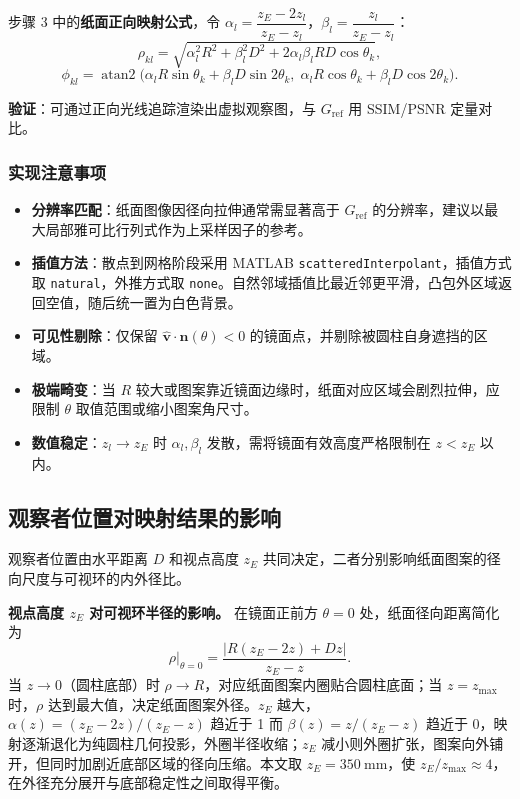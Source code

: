 \documentclass[12pt, a4paper]{ctexart}
\begin{document}
步骤 3 中的\textbf{纸面正向映射公式}，令 $\alpha_l=\dfrac{z_E-2z_l}{z_E-z_l}$，$\beta_l=\dfrac{z_l}{z_E-z_l}$：
\[
\rho_{kl}=\sqrt{\alpha_l^{2}R^{2}+\beta_l^{2}D^{2}+2\alpha_l\beta_l RD\cos\theta_k},
\]
\[
\phi_{kl}=\operatorname{atan2}\!\bigl(\alpha_l R\sin\theta_k+\beta_l D\sin2\theta_k,\;\alpha_l R\cos\theta_k+\beta_l D\cos2\theta_k\bigr).
\]

\textbf{验证}：可通过正向光线追踪渲染出虚拟观察图，与 $G_{\mathrm{ref}}$ 用 SSIM/PSNR 定量对比。

\subsubsection{实现注意事项}
\begin{itemize}
    \item \textbf{分辨率匹配}：纸面图像因径向拉伸通常需显著高于 $G_{\mathrm{ref}}$ 的分辨率，建议以最大局部雅可比行列式作为上采样因子的参考。
    \item \textbf{插值方法}：散点到网格阶段采用 MATLAB \texttt{scatteredInterpolant}，插值方式取 \texttt{natural}，外推方式取 \texttt{none}。自然邻域插值比最近邻更平滑，凸包外区域返回空值，随后统一置为白色背景。
    \item \textbf{可见性剔除}：仅保留 $\hat{\mathbf{v}}\cdot\mathbf{n}(\theta)<0$ 的镜面点，并剔除被圆柱自身遮挡的区域。
    \item \textbf{极端畸变}：当 $R$ 较大或图案靠近镜面边缘时，纸面对应区域会剧烈拉伸，应限制 $\theta$ 取值范围或缩小图案角尺寸。
    \item \textbf{数值稳定}：$z_l\to z_E$ 时 $\alpha_l,\beta_l$ 发散，需将镜面有效高度严格限制在 $z<z_E$ 以内。
\end{itemize}

\subsection{观察者位置对映射结果的影响}

观察者位置由水平距离 $D$ 和视点高度 $z_E$ 共同决定，二者分别影响纸面图案的径向尺度与可视环的内外径比。

\textbf{视点高度 $z_E$ 对可视环半径的影响。}
在镜面正前方 $\theta=0$ 处，纸面径向距离简化为
\[
\rho\big|_{\theta=0}
=\frac{\bigl|R(z_E-2z)+Dz\bigr|}{z_E-z}.
\]
当 $z\to0$（圆柱底部）时 $\rho\to R$，对应纸面图案内圈贴合圆柱底面；当 $z=z_{\max}$ 时，$\rho$ 达到最大值，决定纸面图案外径。$z_E$ 越大，$\alpha(z)=(z_E-2z)/(z_E-z)$ 趋近于 1 而 $\beta(z)=z/(z_E-z)$ 趋近于 0，映射逐渐退化为纯圆柱几何投影，外圈半径收缩；$z_E$ 减小则外圈扩张，图案向外铺开，但同时加剧近底部区域的径向压缩。本文取 $z_E=350\ \mathrm{mm}$，使 $z_E/z_{\max}\approx4$，在外径充分展开与底部稳定性之间取得平衡。
\end{document}
